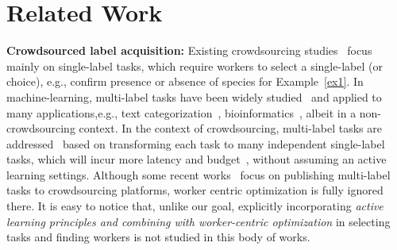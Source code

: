 \vspace{-0.2in}
\section{Related Work}
\vspace{-0.1in}




{\bf Crowdsourced label acquisition:} 
Existing crowdsourcing studies~\cite{single1,single2,single3,single4,single5} focus mainly
on single-label tasks, which require workers to select a single-label
(or choice), e.g., confirm presence or absence of species for Example~\ref{ex1}. In machine-learning, multi-label tasks have been widely studied~\cite{mloc1,mloc2,mloc3} and applied to many applications,e.g., text categorization~\cite{mloc4}, bioinformatics~\cite{mloc5}, albeit in a non-crowdsourcing context. In the context of crowdsourcing, multi-label tasks are
addressed~\cite{single5} based on transforming each task to many independent
single-label tasks, which will incur more latency and budget~\cite{mloc6}, without assuming an active learning settings. Although some recent works~\cite{mloc7,mloc8,mloc9,mloc10} focus on publishing multi-label tasks to crowdsourcing platforms, worker centric optimization is fully ignored there. It is easy to notice that, unlike our goal, explicitly incorporating {\em active learning principles and combining with worker-centric optimization} in selecting tasks and finding workers is not studied in this body of works. 


